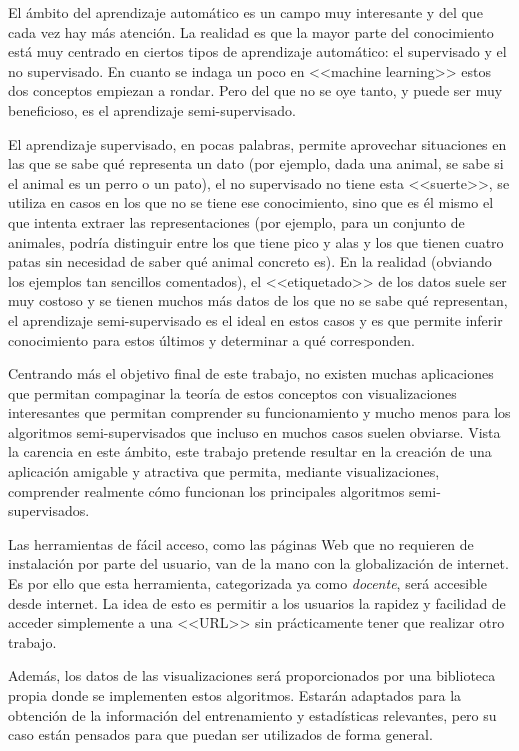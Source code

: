 
El ámbito del aprendizaje automático es un campo muy interesante y del que cada
vez hay más atención. La realidad es que la mayor parte del conocimiento está
muy centrado en ciertos tipos de aprendizaje automático: el supervisado y el no
supervisado. En cuanto se indaga un poco en <<machine learning>> estos dos
conceptos empiezan a rondar. Pero del que no se oye tanto, y puede ser muy
beneficioso, es el aprendizaje semi-supervisado. 

El aprendizaje supervisado, en pocas palabras, permite aprovechar situaciones en
las que se sabe qué representa un dato (por ejemplo, dada una animal, se sabe si
el animal es un perro o un pato), el no supervisado no tiene esta <<suerte>>, se
utiliza en casos en los que no se tiene ese conocimiento, sino que es él mismo
el que intenta extraer las representaciones (por ejemplo, para un conjunto de
animales, podría distinguir entre los que tiene pico y alas y los que tienen
cuatro patas sin necesidad de saber qué animal concreto es). En la realidad
(obviando los ejemplos tan sencillos comentados), el <<etiquetado>> de los datos
suele ser muy costoso y se tienen muchos más datos de los que no se sabe qué
representan, el aprendizaje semi-supervisado es el ideal en estos casos y es que
permite inferir conocimiento para estos últimos y determinar a qué
corresponden.

Centrando más el objetivo final de este trabajo, no existen muchas aplicaciones
que permitan compaginar la teoría de estos conceptos con visualizaciones
interesantes que permitan comprender su funcionamiento y mucho menos para los
algoritmos semi-supervisados que incluso en muchos casos suelen obviarse. Vista la
carencia en este ámbito, este trabajo pretende resultar en la creación de una
aplicación amigable y atractiva que permita, mediante visualizaciones,
comprender realmente cómo funcionan los principales algoritmos
semi-supervisados.

Las herramientas de fácil acceso, como las páginas Web que no requieren de
instalación por parte del usuario, van de la mano con la globalización de
internet. Es por ello que esta herramienta, categorizada ya como
\textit{docente}, será accesible desde internet. La idea de esto es permitir a
los usuarios la rapidez y facilidad de acceder simplemente a una <<URL>> sin
prácticamente tener que realizar otro trabajo.

Además, los datos de las visualizaciones será proporcionados por una biblioteca
propia donde se implementen estos algoritmos. Estarán adaptados para la
obtención de la información del entrenamiento y estadísticas relevantes, pero su
caso están pensados para que puedan ser utilizados de forma general.


